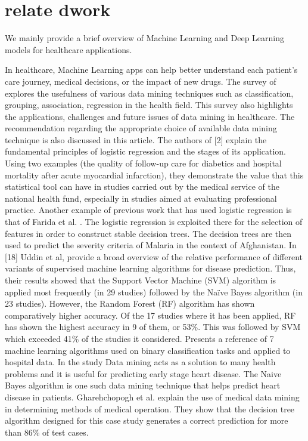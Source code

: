 \section{relate dwork}\label{literature}
We mainly provide a brief overview of Machine Learning and Deep Learning models for healthcare applications. 

In healthcare, Machine Learning apps can help better understand each patient's care journey, medical decisions, or the impact of new drugs. The survey of \cite{tomar2013survey} explores the usefulness of various data mining techniques such as classification, grouping, association, regression in the health field. This survey also highlights the applications, challenges and future issues of data mining in healthcare. The recommendation regarding the appropriate choice of available data mining technique is also discussed in this article. The authors of [2] explain the fundamental principles of logistic regression and the stages of its application. Using two examples (the quality of follow-up care for diabetics and hospital mortality after acute myocardial infarction), they demonstrate the value that this statistical tool can have in studies carried out by the medical service of the national health fund, especially in studies aimed at evaluating professional practice. Another example of previous work that has used logistic regression is that of Farida et al. \cite{adimi2010towards}. The logistic regression is exploited there for the selection of features in order to construct stable decision trees. The decision trees are then used to predict the severity criteria of Malaria in the context of Afghanistan.  
In [18] Uddin et al, provide a broad overview of the relative performance of different variants of supervised machine learning algorithms for disease prediction. Thus, their results showed that the Support Vector Machine (SVM) algorithm is applied most frequently (in 29 studies) followed by the Naïve Bayes algorithm (in 23 studies). However, the Random Forest (RF) algorithm has shown comparatively higher accuracy. Of the 17 studies where it has been applied, RF has shown the highest accuracy in 9 of them, or 53\%. This was followed by SVM which exceeded 41\% of the studies it considered.\cite{de2018binary} Presents a reference of 7 machine learning algorithms used on binary classification tasks and applied to hospital data. In the study \cite{Ug1} Data mining acts as a solution to many health problems and it is useful for predicting early stage heart disease. The Naive Bayes algorithm is one such data mining technique that helps predict heart disease in patients. Gharehchopogh et al. \cite{gharehchopogh2012application} explain the use of medical data mining in determining methods of medical operation. They show that the decision tree algorithm designed for this case study generates a correct prediction for more than 86\% of test cases.

